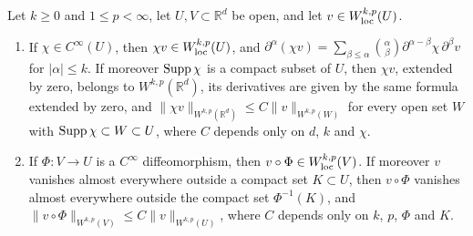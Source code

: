 \begin{lemma}\label{lem:sobolev-leibniz-chain}
Let $k\geq0$ and $1\leq p<\infty$, let $U,V\subset\mathbb R^d$ be open, and let $v\in W^{k,p}_{\mathrm{loc}}(U)$.
\begin{enumerate}
\item If $\chi\in C^\infty(U)$, then $\chi v\in W^{k,p}_{\mathrm{loc}}(U)$, and $\partial^\alpha(\chi v)=\sum_{\beta\leq\alpha}\binom\alpha\beta\partial^{\alpha-\beta}\chi\,\partial^\beta v$ for $|\alpha|\leq k$. If moreover $\operatorname{Supp}\chi$ is a compact subset of $U$, then $\chi v$, extended by zero, belongs to $W^{k,p}(\mathbb R^d)$, its derivatives are given by the same formula extended by zero, and $\|\chi v\|_{W^{k,p}(\mathbb R^d)}\leq C\|v\|_{W^{k,p}(W)}$ for every open set $W$ with $\operatorname{Supp}\chi\subset W\subset U$, where $C$ depends only on $d$, $k$ and $\chi$.
\item If $\Phi\colon V\to U$ is a $C^\infty$ diffeomorphism, then $v\circ\Phi\in W^{k,p}_{\mathrm{loc}}(V)$. If moreover $v$ vanishes almost everywhere outside a compact set $K\subset U$, then $v\circ\Phi$ vanishes almost everywhere outside the compact set $\Phi^{-1}(K)$, and $\|v\circ\Phi\|_{W^{k,p}(V)}\leq C\|v\|_{W^{k,p}(U)}$, where $C$ depends only on $k$, $p$, $\Phi$ and $K$.
\end{enumerate}
\end{lemma}
